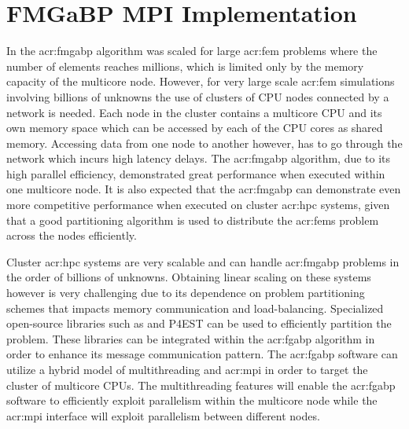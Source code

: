 \section{FMGaBP MPI Implementation}

In  the \gls{acr:fmgabp} algorithm was scaled for large \gls{acr:fem} problems where the number of elements reaches millions, which is limited only by the memory capacity of the multicore node.
However, for very large scale \gls{acr:fem} simulations involving billions of unknowns the use of clusters of CPU nodes connected by a network is needed. 
Each node in the cluster contains a multicore CPU and its own memory space which can be accessed by each of the CPU cores as shared memory.
Accessing data from one node to another however, has to go through the network which incurs high latency delays.
The \gls{acr:fmgabp} algorithm, due to its high parallel efficiency, demonstrated great performance when executed within one multicore node.
It is also expected that the \gls{acr:fmgabp} can demonstrate even more competitive performance when executed on cluster \gls{acr:hpc} systems, given that a good partitioning algorithm is used to distribute the \glspl{acr:fem} problem across the nodes efficiently.


Cluster \gls{acr:hpc} systems are very scalable and can handle \gls{acr:fmgabp} problems in the order of billions of unknowns.
Obtaining linear scaling on these systems however is very challenging due to its dependence on problem partitioning schemes that impacts memory communication and load-balancing.
Specialized open-source libraries such as  \cite{bib:parmetis2013} and {P4EST} \cite{bib:p4est} can be used to efficiently partition the
problem.
These libraries can be integrated within the \gls{acr:fgabp} algorithm in order to enhance its message communication pattern.
The \gls{acr:fgabp} software can utilize a hybrid model of multithreading and \gls{acr:mpi} \cite{bib:mpiForum} in order to target the cluster of multicore CPUs.
The multithreading features will enable the \gls{acr:fgabp} software to efficiently exploit parallelism within the multicore node while the
\gls{acr:mpi} interface will exploit parallelism between different nodes.



